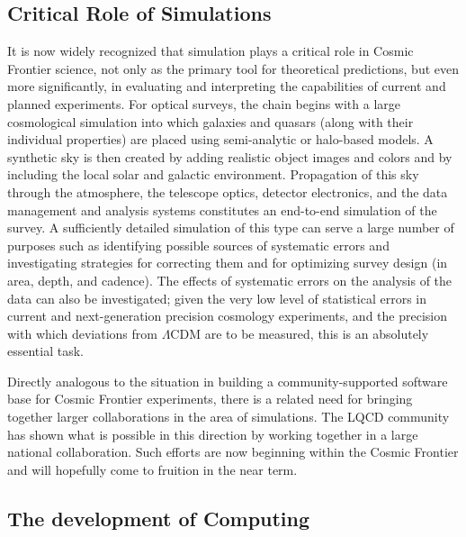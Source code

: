 
\subsection{Critical Role of Simulations}

It is now widely recognized that simulation plays a critical role in
Cosmic Frontier science, not only as the primary tool for theoretical
predictions, but even more significantly, in evaluating and
interpreting the capabilities of current and planned experiments. For
optical surveys, the chain begins with a large cosmological simulation
into which galaxies and quasars (along with their individual
properties) are placed using semi-analytic or halo-based models. A
synthetic sky is then created by adding realistic object images and
colors and by including the local solar and galactic
environment. Propagation of this sky through the atmosphere, the
telescope optics, detector electronics, and the data management and
analysis systems constitutes an end-to-end simulation of the survey. A
sufficiently detailed simulation of this type can serve a large number
of purposes such as identifying possible sources of systematic errors
and investigating strategies for correcting them and for optimizing
survey design (in area, depth, and cadence). The effects of systematic
errors on the analysis of the data can also be investigated; given the
very low level of statistical errors in current and next-generation
precision cosmology experiments, and the precision with which
deviations from $\Lambda$CDM are to be measured, this is an absolutely
essential task.

Directly analogous to the situation in building a community-supported
software base for Cosmic Frontier experiments, there is a related need
for bringing together larger collaborations in the area of
simulations. The LQCD community has shown what is possible in this
direction by working together in a large national collaboration. Such
efforts are now beginning within the Cosmic Frontier and will
hopefully come to fruition in the near term.

\subsection{The development of Computing} 

